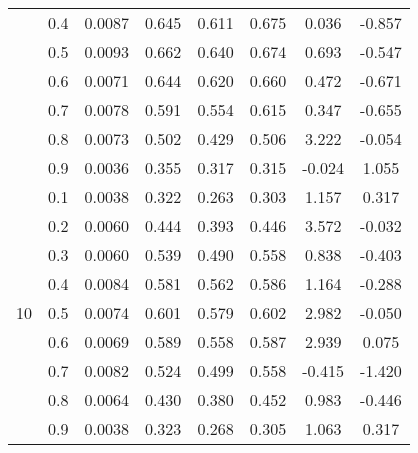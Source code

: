 \documentclass[11pt,a4paper]{report}
\begin{document}
\begin{longtable}{ | c | c || c | c | c | c | c | c | }
 & 0.4 & 0.0087 & 0.645 & 0.611 & 0.675 & 0.036 & -0.857 \\
 & 0.5 & 0.0093 & 0.662 & 0.640 & 0.674 & 0.693 & -0.547 \\
 & 0.6 & 0.0071 & 0.644 & 0.620 & 0.660 & 0.472 & -0.671 \\
 & 0.7 & 0.0078 & 0.591 & 0.554 & 0.615 & 0.347 & -0.655 \\
 & 0.8 & 0.0073 & 0.502 & 0.429 & 0.506 & 3.222 & -0.054 \\
 & 0.9 & 0.0036 & 0.355 & 0.317 & 0.315 & -0.024 & 1.055 \\
 \hline
\multirow{9}{*}{10} & 0.1 & 0.0038 & 0.322 & 0.263 & 0.303 & 1.157 & 0.317 \\
 & 0.2 & 0.0060 & 0.444 & 0.393 & 0.446 & 3.572 & -0.032 \\
 & 0.3 & 0.0060 & 0.539 & 0.490 & 0.558 & 0.838 & -0.403 \\
 & 0.4 & 0.0084 & 0.581 & 0.562 & 0.586 & 1.164 & -0.288 \\
 & 0.5 & 0.0074 & 0.601 & 0.579 & 0.602 & 2.982 & -0.050 \\
 & 0.6 & 0.0069 & 0.589 & 0.558 & 0.587 & 2.939 & 0.075 \\
 & 0.7 & 0.0082 & 0.524 & 0.499 & 0.558 & -0.415 & -1.420 \\
 & 0.8 & 0.0064 & 0.430 & 0.380 & 0.452 & 0.983 & -0.446 \\
 & 0.9 & 0.0038 & 0.323 & 0.268 & 0.305 & 1.063 & 0.317 \\
 \hline
\hline
\end{longtable}
\end{document}
